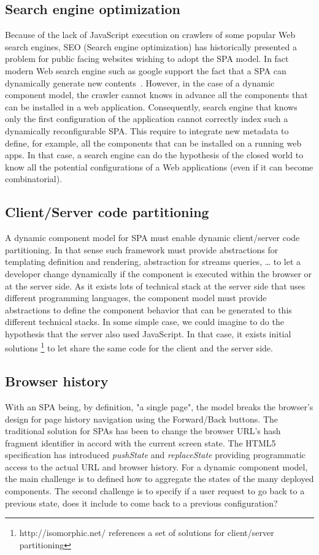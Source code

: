 \subsection{Search engine optimization}
Because of the lack of JavaScript execution on crawlers of some popular Web search engines, SEO (Search engine optimization) has historically presented a problem for public facing websites wishing to adopt the SPA model. In fact modern Web search engine such as google support the fact that a SPA can dynamically generate new contents~\cite{googlesearch}. However, in the case of a dynamic component model, the crawler cannot knows in advance all the components that can be installed in a web application. Consequently, search engine that knows only the first configuration of the application cannot correctly index such a dynamically reconfigurable SPA. This require to integrate new metadata to define, for example, all the components that can be installed on a running web apps. In that case, a search engine can do the hypothesis of the closed world to know all the potential configurations of a Web applications (even if it can become combinatorial).  

\subsection{Client/Server code partitioning}
A dynamic component model for SPA must enable dynamic client/server code partitioning. In that sense such framework must provide abstractions for templating definition and rendering, abstraction for streams queries, … to let a developer change dynamically if the component is executed within the browser or at the server side. As it exists lots of technical stack at the server side that uses different programming languages, the component model must provide abstractions to define the component behavior that can be generated to this different technical stacks. In some simple case, we could imagine to do the hypothesis that the server also used JavaScript. In that case, it exists initial solutions \footnote{http://isomorphic.net/ references a set of solutions for client/server partitioning} to let share the same code for the client and the server side.  

\subsection{Browser history}
With an SPA being, by definition, "a single page", the model breaks the browser's design for page history navigation using the Forward/Back buttons. The traditional solution for SPAs has been to change the browser URL's hash fragment identifier in accord with the current screen state. The HTML5 specification has introduced \textit{pushState} and \textit{replaceState} providing programmatic access to the actual URL and browser history. For a dynamic component model, the main challenge is to defined how to aggregate the states of the many deployed components. The second challenge is to specify if a user request to go back to a previous state, does it include to come back to a previous configuration? 

